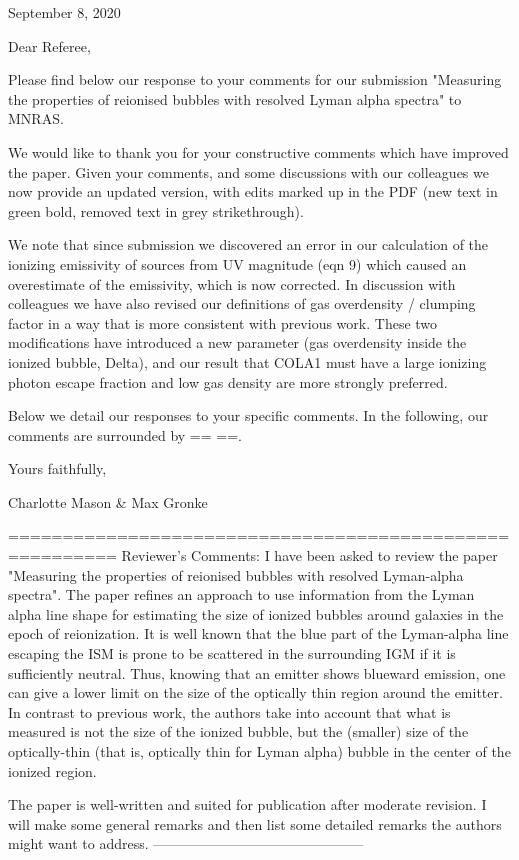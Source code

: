 September 8, 2020
 
 
Dear Referee,
 
Please find below our response to your comments for our submission "Measuring the properties of reionised bubbles with resolved Lyman alpha spectra" to MNRAS. 

We would like to thank you for your constructive comments which have improved the paper. Given your comments, and some discussions with our colleagues we now provide an updated version, with edits marked up in the PDF (new text in green bold, removed text in grey strikethrough).

We note that since submission we discovered an error in our calculation of the ionizing emissivity of sources from UV magnitude (eqn 9) which caused an overestimate of the emissivity, which is now corrected. In discussion with colleagues we have also revised our definitions of gas overdensity / clumping factor in a way that is more consistent with previous work. These two modifications have introduced a new parameter (gas overdensity inside the ionized bubble, Delta), and our result that COLA1 must have a large ionizing photon escape fraction and low gas density are more strongly preferred.

Below we detail our responses to your specific comments. In the following, our comments are surrounded by == ==.

Yours faithfully,


Charlotte Mason & Max Gronke

========================================================
Reviewer's Comments:
I have been asked to review the paper "Measuring the properties of reionised bubbles with resolved Lyman-alpha spectra". The paper refines an approach to use information from the Lyman alpha line shape for estimating the size of ionized bubbles around galaxies in the epoch of reionization. It is well known that the blue part of the Lyman-alpha line escaping the ISM is prone to be scattered in the surrounding IGM if it is sufficiently neutral. Thus, knowing that an emitter shows blueward emission, one can give a lower limit on the size of the optically thin region around the emitter. In contrast to previous work, the authors take into account that what is measured is not the size of the ionized bubble, but the (smaller) size of the optically-thin (that is, optically thin for Lyman alpha) bubble in the center of the ionized region.

The paper is well-written and suited for publication after moderate revision. I will make some general remarks and then list some detailed remarks the authors might want to address.
---------------------------------------------

